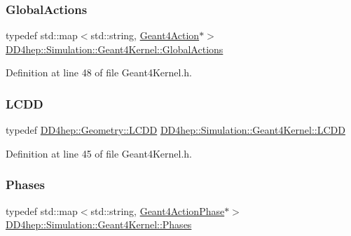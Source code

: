 \subsubsection{\texorpdfstring{Global\+Actions}{GlobalActions}}
{\footnotesize\ttfamily typedef std\+::map$<$std\+::string, \hyperlink{class_d_d4hep_1_1_simulation_1_1_geant4_action}{Geant4\+Action}$\ast$$>$ \hyperlink{class_d_d4hep_1_1_simulation_1_1_geant4_kernel_a9cd070dfd06f049aa11b56688faaa643}{D\+D4hep\+::\+Simulation\+::\+Geant4\+Kernel\+::\+Global\+Actions}}



Definition at line 48 of file Geant4\+Kernel.\+h.

\hypertarget{class_d_d4hep_1_1_simulation_1_1_geant4_kernel_a190e652b62ebce3db3372c4265ffa5a3}{}\label{class_d_d4hep_1_1_simulation_1_1_geant4_kernel_a190e652b62ebce3db3372c4265ffa5a3} 
\subsubsection{\texorpdfstring{L\+C\+DD}{LCDD}}
{\footnotesize\ttfamily typedef \hyperlink{class_d_d4hep_1_1_geometry_1_1_l_c_d_d}{D\+D4hep\+::\+Geometry\+::\+L\+C\+DD} \hyperlink{class_d_d4hep_1_1_simulation_1_1_geant4_kernel_a190e652b62ebce3db3372c4265ffa5a3}{D\+D4hep\+::\+Simulation\+::\+Geant4\+Kernel\+::\+L\+C\+DD}}



Definition at line 45 of file Geant4\+Kernel.\+h.

\hypertarget{class_d_d4hep_1_1_simulation_1_1_geant4_kernel_ae28985781d4226ece4c3fffe8827b400}{}\label{class_d_d4hep_1_1_simulation_1_1_geant4_kernel_ae28985781d4226ece4c3fffe8827b400} 
\subsubsection{\texorpdfstring{Phases}{Phases}}
{\footnotesize\ttfamily typedef std\+::map$<$std\+::string, \hyperlink{class_d_d4hep_1_1_simulation_1_1_geant4_action_phase}{Geant4\+Action\+Phase}$\ast$$>$ \hyperlink{class_d_d4hep_1_1_simulation_1_1_geant4_kernel_ae28985781d4226ece4c3fffe8827b400}{D\+D4hep\+::\+Simulation\+::\+Geant4\+Kernel\+::\+Phases}}



